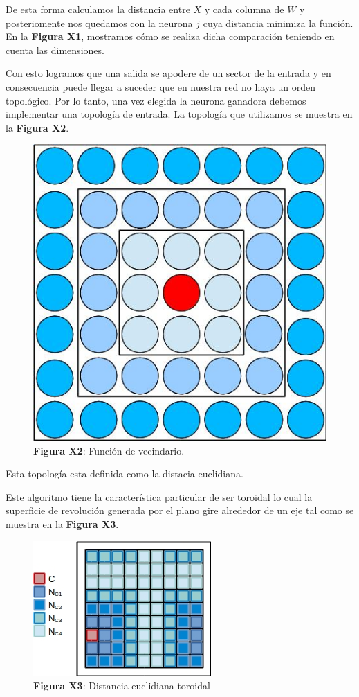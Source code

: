 De esta forma calculamos la distancia entre $X$ y cada columna de $W$ y posteriomente nos quedamos con la neurona $j$ 
cuya distancia minimiza la función. En la \textbf{Figura X1}, mostramos cómo se realiza dicha comparación teniendo en cuenta las dimensiones.

Con esto logramos que una salida se apodere de un sector de la entrada y en consecuencia puede llegar a suceder que en nuestra red
no haya un orden topológico. Por lo tanto, una vez elegida la neurona ganadora debemos implementar una topología de entrada.
La topología que utilizamos se muestra en la \textbf{Figura X2}.

\begin{figure}[ht!]
	\centering
	\includegraphics[width=0.3\linewidth]{img/parte2-vecindario.jpg}
	\caption{\textbf{Figura X2}: Función de vecindario.}
\end{figure}

Esta topología esta definida como la distacia euclidiana. 

%
%

Este algoritmo tiene la característica particular de ser toroidal lo cual la superficie de revolución generada por el plano gire alrededor de un eje tal como se muestra en la \textbf{Figura X3}.

\begin{figure}[ht!]
	\centering
	\includegraphics[width=0.5\linewidth]{img/parte2-toroidal.jpg}
	\caption{\textbf{Figura X3}: Distancia euclidiana toroidal}
\end{figure}

